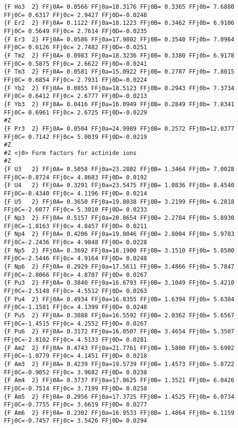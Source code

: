 {\begin{verbatim}
{F Ho3  2} FFj0A= 0.0566 FFj0a=18.3176 FFj0B= 0.3365 FFj0b= 7.6880 FFj0C= 0.6317 FFj0c= 2.9427 FFj0D=-0.0248 
{F Er2  2} FFj0A= 0.1122 FFj0a=18.1223 FFj0B= 0.3462 FFj0b= 6.9106 FFj0C= 0.5649 FFj0c= 2.7614 FFj0D=-0.0235 
{F Er3  2} FFj0A= 0.0586 FFj0a=17.9802 FFj0B= 0.3540 FFj0b= 7.0964 FFj0C= 0.6126 FFj0c= 2.7482 FFj0D=-0.0251 
{F Tm2  2} FFj0A= 0.0983 FFj0a=18.3236 FFj0B= 0.3380 FFj0b= 6.9178 FFj0C= 0.5875 FFj0c= 2.6622 FFj0D=-0.0241 
{F Tm3  2} FFj0A= 0.0581 FFj0a=15.0922 FFj0B= 0.2787 FFj0b= 7.8015 FFj0C= 0.6854 FFj0c= 2.7931 FFj0D=-0.0224 
{F Yb2  2} FFj0A= 0.0855 FFj0a=18.5123 FFj0B= 0.2943 FFj0b= 7.3734 FFj0C= 0.6412 FFj0c= 2.6777 FFj0D=-0.0213 
{F Yb3  2} FFj0A= 0.0416 FFj0a=16.0949 FFj0B= 0.2849 FFj0b= 7.8341 FFj0C= 0.6961 FFj0c= 2.6725 FFj0D=-0.0229 
#Z
{F Pr3  2} FFj0A= 0.0504 FFj0a=24.9989 FFj0B= 0.2572 FFj0b=12.0377 FFj0C= 0.7142 FFj0c= 5.0039 FFj0D=-0.0219 
#Z
#Z <j0> Form factors for actinide ions
#Z
{F U3   2} FFj0A= 0.5058 FFj0a=23.2882 FFj0B= 1.3464 FFj0b= 7.0028 FFj0C=-0.8724 FFj0c= 4.8683 FFj0D= 0.0192 
{F U4   2} FFj0A= 0.3291 FFj0a=23.5475 FFj0B= 1.0836 FFj0b= 8.4540 FFj0C=-0.4340 FFj0c= 4.1196 FFj0D= 0.0214 
{F U5   2} FFj0A= 0.3650 FFj0a=19.8038 FFj0B= 3.2199 FFj0b= 6.2818 FFj0C=-2.6077 FFj0c= 5.3010 FFj0D= 0.0233 
{F Np3  2} FFj0A= 0.5157 FFj0a=20.8654 FFj0B= 2.2784 FFj0b= 5.8930 FFj0C=-1.8163 FFj0c= 4.8457 FFj0D= 0.0211 
{F Np4  2} FFj0A= 0.4206 FFj0a=19.8046 FFj0B= 2.8004 FFj0b= 5.9783 FFj0C=-2.2436 FFj0c= 4.9848 FFj0D= 0.0228 
{F Np5  2} FFj0A= 0.3692 FFj0a=18.1900 FFj0B= 3.1510 FFj0b= 5.8500 FFj0C=-2.5446 FFj0c= 4.9164 FFj0D= 0.0248 
{F Np6  2} FFj0A= 0.2929 FFj0a=17.5611 FFj0B= 3.4866 FFj0b= 5.7847 FFj0C=-2.8066 FFj0c= 4.8707 FFj0D= 0.0267 
{F Pu3  2} FFj0A= 0.3840 FFj0a=16.6793 FFj0B= 3.1049 FFj0b= 5.4210 FFj0C=-2.5148 FFj0c= 4.5512 FFj0D= 0.0263 
{F Pu4  2} FFj0A= 0.4934 FFj0a=16.8355 FFj0B= 1.6394 FFj0b= 5.6384 FFj0C=-1.1581 FFj0c= 4.1399 FFj0D= 0.0248 
{F Pu5  2} FFj0A= 0.3888 FFj0a=16.5592 FFj0B= 2.0362 FFj0b= 5.6567 FFj0C=-1.4515 FFj0c= 4.2552 FFj0D= 0.0267 
{F Pu6  2} FFj0A= 0.3172 FFj0a=16.0507 FFj0B= 3.4654 FFj0b= 5.3507 FFj0C=-2.8102 FFj0c= 4.5133 FFj0D= 0.0281 
{F Am2  2} FFj0A= 0.4743 FFj0a=21.7761 FFj0B= 1.5800 FFj0b= 5.6902 FFj0C=-1.0779 FFj0c= 4.1451 FFj0D= 0.0218 
{F Am3  2} FFj0A= 0.4239 FFj0a=19.5739 FFj0B= 1.4573 FFj0b= 5.8722 FFj0C=-0.9052 FFj0c= 3.9682 FFj0D= 0.0238 
{F Am4  2} FFj0A= 0.3737 FFj0a=17.8625 FFj0B= 1.3521 FFj0b= 6.0426 FFj0C=-0.7514 FFj0c= 3.7199 FFj0D= 0.0258 
{F Am5  2} FFj0A= 0.2956 FFj0a=17.3725 FFj0B= 1.4525 FFj0b= 6.0734 FFj0C=-0.7755 FFj0c= 3.6619 FFj0D= 0.0277 
{F Am6  2} FFj0A= 0.2302 FFj0a=16.9533 FFj0B= 1.4864 FFj0b= 6.1159 FFj0C=-0.7457 FFj0c= 3.5426 FFj0D= 0.0294 

\end{verbatim}}
